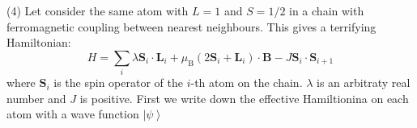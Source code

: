 \documentclass[letterpaper,10pt]{article}
\begin{document}
\indent (4) Let consider the same atom with $L=1$ and $S=1/2$ in a chain with ferromagnetic coupling between nearest neighbours. This gives a terrifying Hamiltonian: 
$$
H=\sum _ {i} \lambda \bm{S}_i \cdot \bm{L}_i+ \mu_{\mathrm{B}} (2\bm{S}_i+\bm{L}_i)\cdot \bm{B}-J \bm{S}_i\cdot \bm{S}_{i+1}
$$
where $\bm{S}_i$ is the spin operator of the $i$-th atom on the chain. $\lambda$ is an arbitraty real number and $J$ is positive.
First we write down the effective Hamiltionina on each atom with a wave function $\left|\psi\right>$
\end{document}
